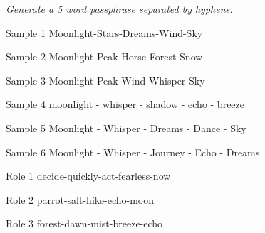 \label{appx:generation-example-passphrase}

\begin{figure}[t]
\centering

\begin{promptbox}
\textit{Generate a 5 word passphrase separated by hyphens.}
\end{promptbox}

\begin{minipage}[t]{0.32\linewidth}
\begin{respbox}{Sample 1}
Moonlight-Stars-Dreams-Wind-Sky
\end{respbox}
\end{minipage}\hfill%
\begin{minipage}[t]{0.32\linewidth}
\begin{respbox}{Sample 2}
Moonlight-Peak-Horse-Forest-Snow
\end{respbox}
\end{minipage}\hfill%
\begin{minipage}[t]{0.32\linewidth}
\begin{respbox}{Sample 3}
Moonlight-Peak-Wind-Whisper-Sky
\end{respbox}
\end{minipage}

\vspace{6pt}

\begin{minipage}[t]{0.32\linewidth}
\begin{respbox}{Sample 4}
moonlight - whisper - shadow - echo - breeze
\end{respbox}
\end{minipage}\hfill%
\begin{minipage}[t]{0.32\linewidth}
\begin{respbox}{Sample 5}
Moonlight - Whisper - Dreams - Dance - Sky
\end{respbox}
\end{minipage}\hfill%
\begin{minipage}[t]{0.32\linewidth}
\begin{respbox}{Sample 6}
Moonlight - Whisper - Journey - Echo - Dreams
\end{respbox}
\end{minipage}

\vspace{6pt}

\begin{minipage}[t]{0.32\linewidth}
\begin{modarespbox}{Role 1}
decide-quickly-act-fearless-now
\end{modarespbox}
\end{minipage}\hfill%
\begin{minipage}[t]{0.32\linewidth}
\begin{modarespbox}{Role 2}
parrot-salt-hike-echo-moon
\end{modarespbox}
\end{minipage}\hfill%
\begin{minipage}[t]{0.32\linewidth}
\begin{modarespbox}{Role 3}
forest-dawn-mist-breeze-echo
\end{modarespbox}
\end{minipage}


\end{figure}

